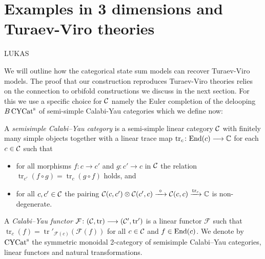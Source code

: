 
\section{Examples in 3 dimensions and Turaev-Viro theories}\label{sec:3D}

LUKAS

We will outline how the categorical state sum models can recover Turaev-Viro models. The proof that our construction reproduces Turaev-Viro theories relies on the connection to orbifold constructions we discuss in the next section.
For this we use a specific choice for $\mathcal{C}$ namely the Euler completion of the delooping $B\operatorname{\mathrm{CYCat}^s}$ of semi-simple Calabi-Yau categories which we define now:

\begin{definition}
	A \emph{semisimple Calabi--Yau category} is a semi-simple linear category $\mathcal{C}$ with finitely many simple objects together with a linear
	trace map $\operatorname{tr}_c \colon \mathrm{End} (c) \longrightarrow \mathbb{C}$ for each $c\in \mathcal{C}$ such that
	\begin{itemize}
		\item
		for all morphisms $f\colon c \longrightarrow c'$ and $g\colon c' \longrightarrow c$ in $\mathcal{C}$ the relation $\operatorname{tr}_{c'}(f\circ g)= \operatorname{tr}_c({g\circ f})$ holds, and
		\item
		for all $c,c'\in \mathcal{C}$ the pairing $\mathcal{C}(c,c') \otimes \mathcal{C}(c',c) \xrightarrow{\  \circ  \ } \mathcal{C}(c,c) \xrightarrow{\operatorname{tr}_c} \mathbb{C}$ is non-degenerate.
	\end{itemize}
	A \emph{Calabi--Yau functor} $\mathcal{F} \colon (\mathcal{C}, \operatorname{tr}) \longrightarrow (\mathcal{C}' , \operatorname{tr}')$ is a linear functor $\mathcal{F}$ such that $\operatorname{tr}_c(f)= \operatorname{tr}'_{\mathcal{F}(c)}(\mathcal{F}(f)) $ for all $c\in \mathcal{C}$ and $f\in \mathrm{End}(c)$. We denote by
	$\operatorname{\mathrm{CYCat}^s}$ the symmetric monoidal 2-category of semisimple Calabi--Yau categories, linear functors and natural transformations.
\end{definition}

